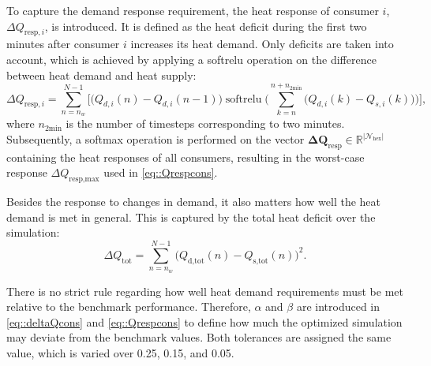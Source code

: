To capture the demand response requirement, the heat response of consumer $i$, $\Delta Q_{\text{resp},i}$, is introduced. It is defined as the heat deficit during the first two minutes after consumer $i$ increases its heat demand. Only deficits are taken into account, which is achieved by applying a softrelu operation on the difference between heat demand and heat supply:
\begin{equation}\label{eq::Qresp}
    \Delta Q_{\text{resp},i} = \sum_{n = n_w}^{N-1} \bigg[\big(Q_{d,i}(n) - Q_{d,i}(n-1)\big)
      \operatorname{softrelu}\bigg(\sum_{k=n}^{n+n_{\text{2min}}} \big(Q_{d,i}(k) - Q_{s,i}(k)\big)\bigg)\bigg],
\end{equation}
where $n_{\text{2min}}$ is the number of timesteps corresponding to two minutes. Subsequently, a softmax operation is performed on the vector $\boldsymbol{\Delta Q}_{\text{resp}} \in \mathbb{R}^{|\mathcal{N}_{\text{hex}}|}$ containing the heat responses of all consumers, resulting in the worst-case response $\Delta Q_{\text{resp,max}}$ used in \eqref{eq::Qrespcons}.

Besides the response to changes in demand, it also matters how well the heat demand is met in general. This is captured by the total heat deficit over the simulation:
\begin{equation}\label{eq::Qtot}
      \Delta Q_{\text{tot}} = \sum_{n = n_w}^{N-1} \big(Q_{\text{d,tot}}(n)-Q_{\text{s,tot}}(n)\big)^2.
\end{equation}

There is no strict rule regarding how well heat demand requirements must be met relative to the benchmark performance. Therefore, $\alpha$ and $\beta$ are introduced in \eqref{eq::deltaQcons} and \eqref{eq::Qrespcons} to define how much the optimized simulation may deviate from the benchmark values. Both tolerances are assigned the same value, which is varied over 0.25, 0.15, and 0.05.




